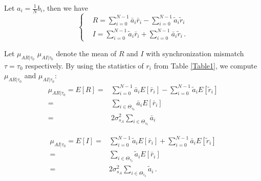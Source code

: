 Let $a_i = \frac{1}{N}b_i$, then we have 
\begin{equation}
  \begin{cases}
	&R = \sum_{i=0}^{N-1}\bar{a}_i\bar{r}_i - \sum_{i=0}^{N-1}\tilde{a}_i\tilde{r}_i\\
	&I = \sum_{i=0}^{N-1}\tilde{a}_i\bar{r}_i +\sum_{i=0}^{N-1}\bar{a}_i\tilde{r}_i\,.
  \end{cases}
  \label{definitionofRI}
\end{equation}

Let $\mu_{AR|\tau_0}$ $\mu_{AI|\tau_0}$ denote the mean of $R$ and $I$ with synchronization mismatch $\tau=\tau_0$ respectively. By using the statistics of $r_i$ from Table \ref{Table1}, we compute  $\mu_{AR|\tau_0}$ and  $\mu_{AI|\tau_0}$:
\begin{equation}
  \begin{split}
	\mu_{AR|\tau_0} =  E[R] = &\sum_{i=0}^{N-1}\bar{a}_iE[\bar{r}_i] - \sum_{i=0}^{N-1}\tilde{a}_iE[\tilde{r}_i]\\
	= &\sum_{i\in\Theta_{\tau_0}}\bar{a}_iE[\bar{r}_i]\\
	= &2\sigma_{s_A}^2\sum_{i\in\Theta_{\tau_0}}\bar{a}_i
  \end{split}
  \label{ER}
\end{equation}

\begin{equation}
  \begin{split}
	\mu_{AI|\tau_0} =  E[I] = &\sum_{i=0}^{N-1}\tilde{a}_iE[\bar{r}_i] + \sum_{i=0}^{N-1}\bar{a}_iE[\tilde{r}_i]\\
	= &\sum_{i\in\Theta_{\tau_0}}\tilde{a}_iE[\bar{r}_i]\\
    = &2\sigma_{s_A}^2\sum_{i\in\Theta_{\tau_0}}\tilde{a}_i\,.
  \end{split}
  \label{EI}
\end{equation}


